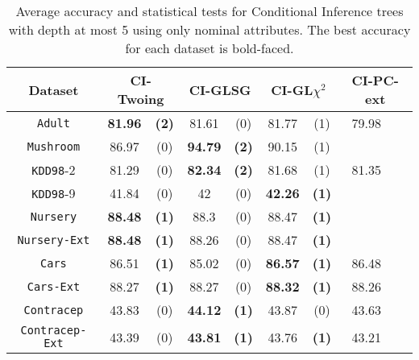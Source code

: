 \begin{table*}
\small
\centering
    \caption{Average accuracy and statistical tests  for  Conditional Inference trees 
with depth at most 5 using only nominal attributes. The best accuracy for each dataset is bold-faced.}
\label{tab:CrossValCTree}
\begin{tabular}{c|cc|cc|cc|cc} 
Dataset  &   \multicolumn{2}{c|}{CI-Twoing} &   \multicolumn{2}{c|}{CI-GLSG} & \multicolumn{2}{c|}{CI-GL$\chi^2$}& \multicolumn{2}{c}{CI-PC-ext} \\  \hline   
{\tt Adult}        &{\bf 81.96} &{\bf  (2)} & 81.61       & (0)       & 81.77       & (1)       &  79.98      &           \\
{\tt Mushroom}     &86.97       & (0)       &{\bf  94.79 }& {\bf (2)} & 90.15       & (1)       &             &           \\
{\tt KDD98}-2      &81.29       & (0)       & {\bf 82.34 }& {\bf (2) }& 81.68       & (1)       &  81.35      &           \\
{\tt KDD98}-9      &41.84       & (0)       & 42          & (0)       & {\bf 42.26} & {\bf (1)} &             &           \\
{\tt Nursery}      &{\bf 88.48} & {\bf (1)} & 88.3        & (0)       & 88.47       & {\bf (1)} &             &           \\
{\tt Nursery-Ext}  &{\bf 88.48} & {\bf (1)} & 88.26       & (0)       & 88.47       & {\bf (1)} &             &           \\
{\tt Cars}         &86.51       & {\bf (1)} & 85.02       & (0)       & {\bf 86.57} & {\bf (1)} & 86.48       &           \\
{\tt Cars-Ext}     &88.27       & {\bf (1) }& 88.27       & (0)       & {\bf 88.32} & {\bf (1)} & 88.26       &           \\
{\tt Contracep}    &43.83       & (0)       & {\bf 44.12} & {\bf (1)} & 43.87       & (0)       & 43.63       &           \\
{\tt Contracep-Ext}&43.39       & (0)       & {\bf 43.81} & {\bf (1)} & 43.76       & {\bf (1)} & 43.21       &           \\

\end{tabular}
\end{table*}
